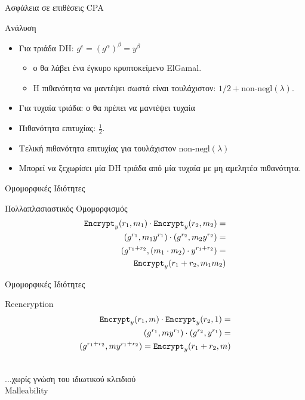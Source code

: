 \documentclass[handout]{beamer}
\begin{document}
\begin{frame}{Ασφάλεια σε επιθέσεις CPA}
\begin{block}{Ανάλυση}
\begin{itemize}

\item Για τριάδα DH: $g^c = (g^\alpha)^\beta = y^\beta $ 
\begin{itemize}
	\item ο \adv θα λάβει ένα έγκυρο κρυπτοκείμενο ElGamal.
	\item H πιθανότητα να μαντέψει σωστά είναι τουλάχιστον: ${1}/{2} + \text{non-negl}(\lambda)$. 
\end{itemize}


\item Για τυχαία τριάδα: ο \adv θα πρέπει να μαντέψει τυχαία
\item Πιθανότητα επιτυχίας: $\frac{1}{2}$.

\item Τελική πιθανότητα επιτυχίας για \advb τουλάχιστον $\text{non-negl}(\lambda)$
\item Μπορεί να ξεχωρίσει μία DH τριάδα από μία τυχαία με μη αμελητέα πιθανότητα.

\end{itemize}
\end{block}
\end{frame}

\begin{frame}{Ομομορφικές Ιδιότητες}

\begin{block}{Πολλαπλασιαστικός Ομομορφισμός}
\begin{align*}
\mathtt{Encrypt}_y(r_1,m_1) \cdot \mathtt{Encrypt}_y(r_2,m_2) = \\
(g^{r_1}, m_1 y^{r_1}) \cdot (g^{r_2}, m_2 y^{r_2}) =\\
(g^{r_1+r_2}, (m_1 \cdot m_2) \cdot y^{r_1+r_2}) = \\
\mathtt{Encrypt}_y( r_1+r_2,m_1  m_2)
\end{align*}
\end{block}

\end{frame}

\begin{frame}{Ομομορφικές Ιδιότητες}

\begin{block}{Reencryption}
\begin{align*}
\mathtt{Encrypt}_y(r_1,m) \cdot \mathtt{Encrypt}_y(r_2,1) = \\
(g^{r_1}, my^{r_1}) \cdot (g^{r_2},  y^{r_1}) =\\
(g^{r_1+r_2}, my^{r_1+r_2}) =
\mathtt{Encrypt}_y(r_1+r_2,m) 
\end{align*}
\end{block}
 \\
\alert{...χωρίς γνώση του ιδιωτικού κλειδιού} \\
\alert{Malleability}

\end{frame}
\end{document}
